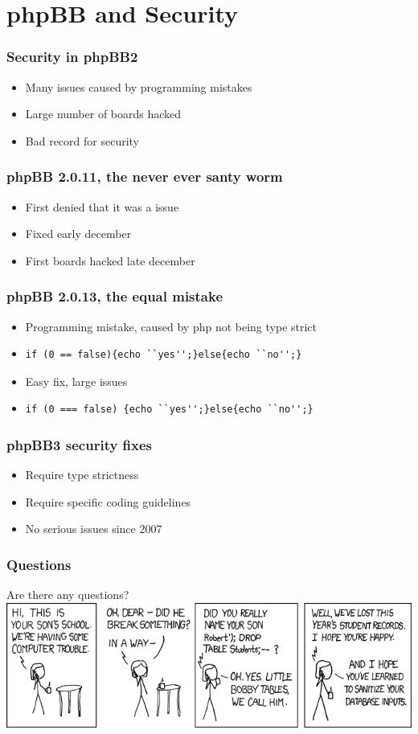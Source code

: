 \documentclass{beamer}
\begin{document}
\section{phpBB and Security}
\begin{frame}
  \frametitle{Security in phpBB2}
  \begin{itemize}
    \item Many issues caused by programming mistakes
    \item Large number of boards hacked
    \item Bad record for security
  \end{itemize}
\end{frame}

\begin{frame}
  \frametitle{phpBB 2.0.11, the never ever santy worm}
  \begin{itemize}
    \item First denied that it was a issue
    \item Fixed early december
    \item First boards hacked late december
  \end{itemize}
\end{frame}

\begin{frame}[fragile]
  \frametitle{phpBB 2.0.13, the equal mistake}
  \begin{itemize}
    \item Programming mistake, caused by php not being type strict
      \item \begin{lstlisting}
if (0 == false){echo ``yes'';}else{echo ``no'';}
      \end{lstlisting}
    \item Easy fix, large issues
    \item \begin{lstlisting}
if (0 === false) {echo ``yes'';}else{echo ``no'';}
      \end{lstlisting}
  \end{itemize}
\end{frame}

\begin{frame}
  \frametitle{phpBB3 security fixes}
  \begin{itemize}
    \item Require type strictness
    \item Require specific coding guidelines
    \item No serious issues since 2007
  \end{itemize}
\end{frame}

\begin{frame}
  \frametitle{Questions}
  Are there any questions?\\
    \includegraphics[scale=0.5]{exploits_of_a_mom.png}
\end{frame}
\end{document}
